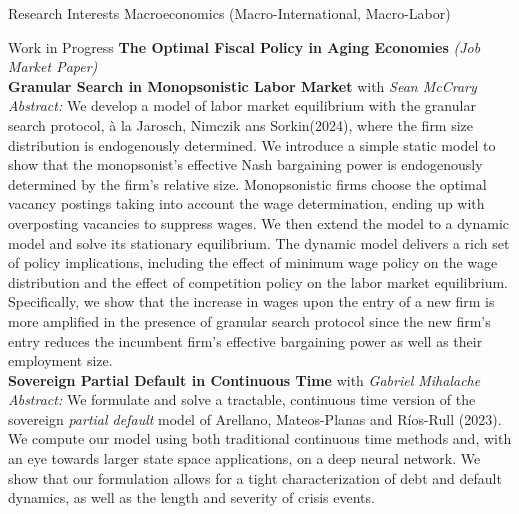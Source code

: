 \documentclass{cv} %
\begin{document}
\begin{rSection}{Research Interests}
Macroeconomics (Macro-International, Macro-Labor)
\end{rSection}
\bigskip
\begin{rSection}{Work in Progress}
\medskip
{\bf The Optimal Fiscal Policy in Aging Economies} \emph{(Job Market Paper)} \\


\medskip
{\bf Granular Search in Monopsonistic Labor Market} with \emph{Sean McCrary} \\
\begin{adjustbox}{minipage=0.95\textwidth, right}
	\vspace{0.3em} {\emph{Abstract:} We develop a model of labor market equilibrium with the granular search protocol, à la Jarosch, Nimczik ans Sorkin(2024), where the firm size distribution is endogenously determined. We introduce a simple static model to show that the monopsonist's effective Nash bargaining power is endogenously determined by the firm's relative size. Monopsonistic firms choose the optimal vacancy postings taking into account the wage determination, ending up with overposting vacancies to suppress wages. We then extend the model to a  dynamic model and solve its stationary equilibrium. The dynamic model delivers a rich set of policy implications, including the effect of minimum wage policy on the wage distribution and the effect of competition policy on the labor market equilibrium. Specifically, we show that the increase in wages upon the entry of a new firm is more amplified in the presence of granular search protocol since the new firm's entry reduces the incumbent firm's effective bargaining power as well as their employment size.}
\end{adjustbox}\\

\medskip
{\bf Sovereign Partial Default in Continuous Time} with \emph{Gabriel Mihalache} \\
	 \begin{adjustbox}{minipage=0.95\textwidth, right}
		\vspace{0.3em} {\emph{Abstract:} We formulate and solve a tractable, continuous time version of the sovereign \emph{partial default} model of Arellano, Mateos-Planas and Ríos-Rull (2023). We compute our model using both traditional continuous time methods and, with an eye towards larger state space applications, on a deep neural network. We show that our formulation allows for a tight characterization of debt and default dynamics, as well as the length and severity of crisis events.}
	\end{adjustbox}\\


\end{rSection}
\end{document}
